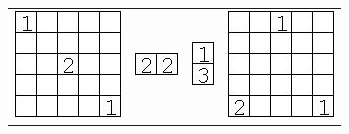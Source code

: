\begin{appendix}
{\begin{tabular}{m{4cm}m{4cm}m{4cm}m{4cm}}
\centerline{\includegraphics{imgs/models/model17}}&\centerline{\includegraphics{imgs/models/model18}}&\centerline{\includegraphics{imgs/models/model19}}&\centerline{\includegraphics{imgs/models/model20}}
\end{tabular}}
\end{appendix}